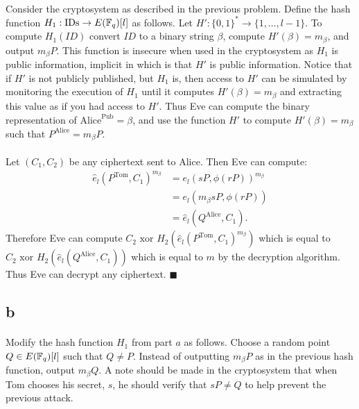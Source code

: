 \documentclass[letterpaper,12pt,oneside,onecolumn]{article}
\begin{document}
\paragraph{}
Consider the cryptosystem as described in the previous problem. Define the hash function $H_1: \text{IDs} \rightarrow E(\mathbb{F}_q)[l]$ as follows. Let $H' : \{0,1\}^* \rightarrow \{1,\dots, l-1\}$. To compute $H_1(ID)$ convert $ID$ to a binary string $\beta$, compute $H'(\beta) = m_\beta$, and output $m_\beta P$. This function is insecure when used in the cryptosystem as $H_1$ is public information, implicit in which is that $H'$ is public information. Notice that if $H'$ is not publicly published, but $H_1$ is, then access to $H'$ can be simulated by monitoring the execution of $H_1$ until it computes $H'(\beta) = m_\beta$ and extracting this value as if you had access to $H'$. Thus Eve can compute the binary representation of $\text{Alice}^\text{Pub} = \beta$, and use the function $H'$ to compute $H'(\beta) = m_\beta$ such that $P^\text{Alice} = m_\beta P$.
\paragraph{}
Let $(C_1,C_2)$ be any ciphertext sent to Alice. Then Eve can compute:
\begin{align*}
\hat{e}_l(P^\text{Tom}, C_1)^{m_\beta} &= e_l(sP, \phi(rP))^{m_\beta} \\
&= e_l(m_\beta sP, \phi(rP)) \\
&= \hat{e}_l(Q^\text{Alice}, C_1).
\end{align*}
Therefore  Eve can compute $C_2\text{ xor } H_2(\hat{e}_l(P^\text{Tom}, C_1)^{m_\beta})$ which is equal to $C_2\text{ xor } H_2(\hat{e}_l(Q^\text{Alice}, C_1))$ which is equal to $m$ by the decryption algorithm. Thus Eve can decrypt any ciphertext. $\blacksquare$
\subsection*{b}
\paragraph{}
Modify the hash function $H_1$ from part $a$ as follows. Choose a random point $Q \in E(\mathbb{F}_q)[l]$ such that $Q \neq P$. Instead of outputting $m_\beta P$ as in the previous hash function, output $m_\beta Q$. A note should be made in the cryptosystem that when Tom chooses his secret, $s$, he should verify that $sP \neq Q$ to help prevent the previous attack.
\end{document}
